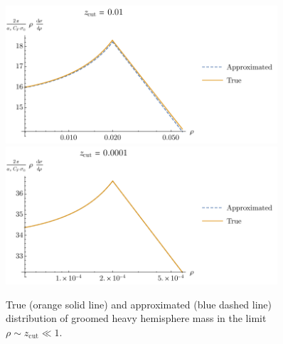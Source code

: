 \documentclass[../thesis.tex]{subfiles}
\providecommand{\zcut}{z_\mathrm{{cut}}}
\begin{document}
	\begin{figure}
	\begin{center}
		\includegraphics[width=0.9\textwidth]{figures/approximation_small_zcut_0.01.pdf}
		\includegraphics[width=0.9\textwidth]{figures/approximation_small_zcut_0.0001.pdf}

		\caption{\label{leading-fig:fixed order approx}True (orange solid line) and approximated (blue dashed line) distribution of groomed heavy hemisphere mass in the limit $\rho \sim \zcut \ll 1$.}
	\end{center}
	\end{figure}
\end{document}
